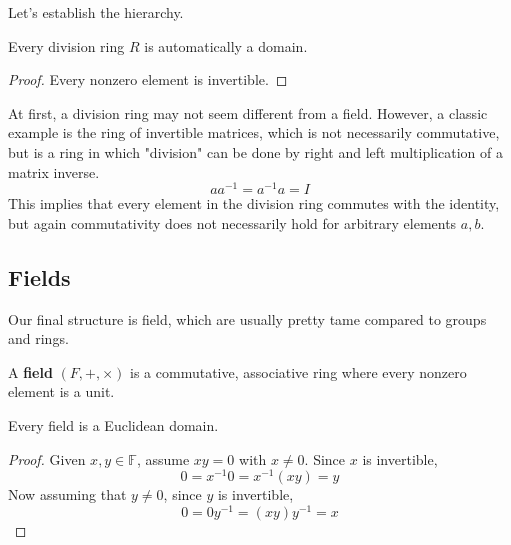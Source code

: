   Let's establish the hierarchy. 

  \begin{lemma}
    Every division ring $R$ is automatically a domain. 
  \end{lemma}
  \begin{proof}
    Every nonzero element is invertible. 
  \end{proof}

  \begin{example}
    At first, a division ring may not seem different from a field. However, a classic example is the ring of invertible matrices, which is not necessarily commutative, but is a ring in which "division" can be done by right and left multiplication of a matrix inverse. 
    \begin{equation}
      a a^{-1} = a^{-1} a = I
    \end{equation}
    This implies that every element in the division ring commutes with the identity, but again commutativity does not necessarily hold for arbitrary elements $a, b$. 
  \end{example} 

\subsection{Fields}

  Our final structure is field, which are usually pretty tame compared to groups and rings. 

  \begin{definition}[Field]
    A \textbf{field} $(F, +, \times)$ is a commutative, associative ring where every nonzero element is a unit. 
  \end{definition}

  \begin{theorem}
    Every field is a Euclidean domain. 
  \end{theorem}
  \begin{proof}
    Given $x, y \in \mathbb{F}$, assume $x y = 0$ with $x \neq 0$. Since $x$ is invertible,
    \begin{equation}
      0 = x^{-1} 0 = x^{-1} (x y) = y
    \end{equation}
    Now assuming that $y \neq 0$, since $y$ is invertible, 
    \begin{equation}
      0 = 0 y^{-1} = (x y) y^{-1} = x
    \end{equation}
  \end{proof}

